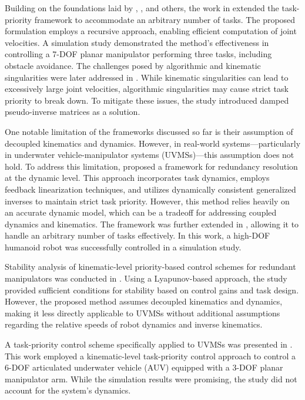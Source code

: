 Building on the foundations laid by \cite{hanafusa1981}, \cite{nakamura1987}, and others, the work in \cite{siciliano1991} extended the task-priority framework to accommodate an arbitrary number of tasks. The proposed formulation employs a recursive approach, enabling efficient computation of joint velocities. A simulation study demonstrated the method's effectiveness in controlling a 7-DOF planar manipulator performing three tasks, including obstacle avoidance. The challenges posed by algorithmic and kinematic singularities were later addressed in \cite{chiaverini1997}. While kinematic singularities can lead to excessively large joint velocities, algorithmic singularities may cause strict task priority to break down. To mitigate these issues, the study introduced damped pseudo-inverse matrices as a solution.

One notable limitation of the frameworks discussed so far is their assumption of decoupled kinematics and dynamics. However, in real-world systems—particularly in underwater vehicle-manipulator systems (UVMSs)—this assumption does not hold. To address this limitation, \cite{khatib1987} proposed a framework for redundancy resolution at the dynamic level. This approach incorporates task dynamics, employs feedback linearization techniques, and utilizes dynamically consistent generalized inverses \cite{khatib1995} to maintain strict task priority. However, this method relies heavily on an accurate dynamic model, which can be a tradeoff for addressing coupled dynamics and kinematics. The framework was further extended in \cite{khatib2004}, allowing it to handle an arbitrary number of tasks effectively. In this work, a high-DOF humanoid robot was successfully controlled in a simulation study.

Stability analysis of kinematic-level priority-based control schemes for redundant manipulators was conducted in \cite{antonelli2009}. Using a Lyapunov-based approach, the study provided sufficient conditions for stability based on control gains and task design. However, the proposed method assumes decoupled kinematics and dynamics, making it less directly applicable to UVMSs without additional assumptions regarding the relative speeds of robot dynamics and inverse kinematics.

A task-priority control scheme specifically applied to UVMSs was presented in \cite{antonelli1998}. This work employed a kinematic-level task-priority control approach to control a 6-DOF articulated underwater vehicle (AUV) equipped with a 3-DOF planar manipulator arm. While the simulation results were promising, the study did not account for the system's dynamics.

